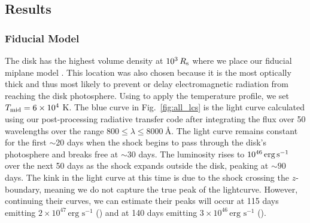 \subsection{Results} \label{sec:results}

\subsubsection{Fiducial Model} \label{sec:fiducial-results}

The \citet{SirkoGoodman03} disk has the highest volume density at $10^3\,R_{\rm s}$ where we place our fiducial miplane model .
This location was also chosen because it is the most optically thick and thus most likely to prevent or delay electromagnetic radiation from reaching the disk photosphere.
Using  to apply the temperature profile, we set $T_\text{mid}=6\times10^4$ K.
The blue curve in Fig.~\ref{fig:all_lcs} is the light curve calculated using our post-processing radiative transfer code \ocotillo
after integrating the flux over 50 wavelengths over the range $800\leq\lambda\leq8000\ \text{\AA}$.
The light curve remains constant for the first $\sim$20 days when the shock begins to pass through the disk's photosphere and breaks free at $\sim$30 days.
The luminosity rises to $10^{46}\,{\rm erg\,s}^{-1}$ over the next 50 days as the shock expands outside the disk, peaking at $\sim90$ days.
The kink in the light curve at this time is due to the shock crossing the $z$-boundary, meaning we do not capture the true peak of the lightcurve.
However, continuing their curves, we can estimate their peaks will occur at 115 days emitting $2\times10^{47}\,\text{erg s}^{-1}$ () and at 140 days emitting $3\times10^{46}\,\text{erg s}^{-1}$ ().


